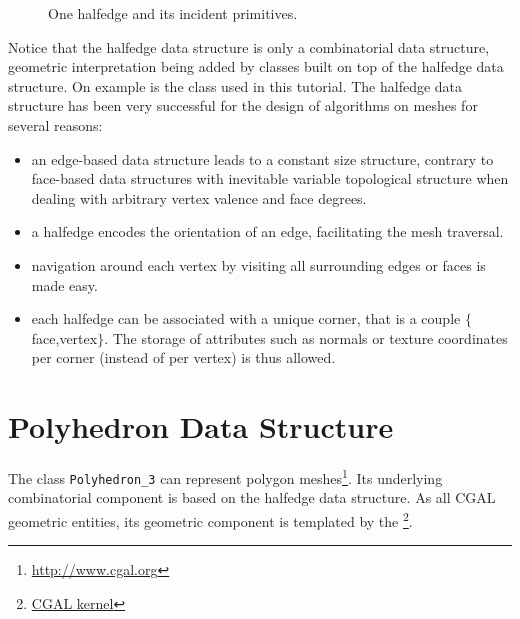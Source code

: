 \documentclass[letter,twoside,10pt]{article}
\begin{document}

\begin{figure}[htb]
    \caption{One halfedge and its incident primitives.}
    \label{fig:halfedge}
\end{figure}
        
Notice that the halfedge data structure is only a combinatorial data
structure, geometric interpretation being added by classes built on
top of the halfedge data structure. On example is the class
 used in this tutorial. The 
halfedge data structure has been very successful for the design of
algorithms on meshes for several reasons:

\begin{itemize}

\item 
an edge-based data structure leads to a constant size structure,
contrary to face-based data structures with inevitable variable
topological structure when dealing with arbitrary vertex valence and
face degrees.

\item 
a halfedge encodes the orientation of an edge, facilitating the mesh
traversal.

\item 
navigation around each vertex by visiting all surrounding edges or
faces is made easy.

\item
each halfedge can be associated with a unique corner, that is a couple
$\{$face,vertex$\}$. The storage of attributes such as normals or
texture coordinates per corner (instead of per vertex) is thus
allowed.

\end{itemize}

\section{Polyhedron Data Structure}
\label{sec:polyhedron}

The class \verb+Polyhedron_3+ can represent polygon
meshes\footnote{\href{http://www.cgal.org/Manual/doc_html/basic_lib/Polyhedron_ref/Class_Polyhedron_3.html}{http://www.cgal.org}}.
Its underlying combinatorial component is based on the halfedge data
structure. As all CGAL geometric entities, its geometric component is
templated by the
\footnote{\href{http://www.CGAL.org/Manual/doc_html/frameset/fsKernel.html}{CGAL kernel}}.
\end{document}
